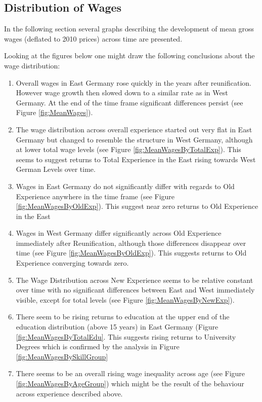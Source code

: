 \documentclass{article}
\begin{document}
\subsection{Distribution of Wages}
In the following section several graphs describing the development of mean gross wages (deflated to 2010 prices) across time are presented.

Looking at the figures below one might draw the following conclusions about the wage distribution:

\begin{enumerate}
	\item Overall wages in East Germany rose quickly in the years after reunification. However wage growth then slowed down to a similar rate as in West Germany. At the end of the time frame significant differences persist (see Figure \ref{fig:MeanWages}).
	\item The wage distribution across overall experience started out very flat in East Germany but changed to resemble the structure in West Germany, although at lower total wage levels (see Figure \ref{fig:MeanWagesByTotalExp}). This seems to suggest returns to Total Experience in the East rising towards West German Levels over time.
	\item Wages in East Germany do not significantly differ with regards to Old Experience anywhere in the time frame (see Figure \ref{fig:MeanWagesByOldExp}). This suggest near zero returns to Old Experience in the East
	\item Wages in West Germany differ significantly across Old Experience immediately after Reunification, although those differences disappear over time (see Figure \ref{fig:MeanWagesByOldExp}). This suggests returns to Old Experience converging towards zero.
	\item The Wage Distribution across New Experience seems to be relative constant over time with no significant differences between East and West immediately visible, except for total levels (see Figure \ref{fig:MeanWagesByNewExp}). 
	\item There seem to be rising returns to education at the upper end of the education distribution (above 15 years) in East Germany (Figure \ref{fig:MeanWagesByTotalEdu}. This suggests rising returns to University Degrees which is confirmed by the analysis in Figure \ref{fig:MeanWagesBySkillGroup}
	\item There seems to be an overall rising wage inequality across age (see Figure \ref{fig:MeanWagesByAgeGroup}) which might be the result of the behaviour across experience described above.
\end{enumerate} 
 
\end{document}
